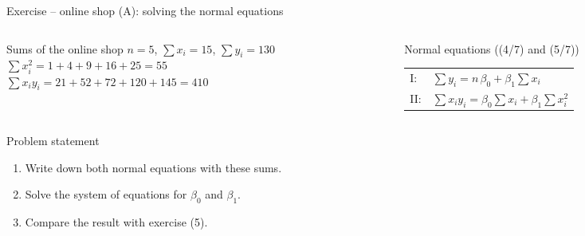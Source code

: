 \documentclass[aspectratio=169,11pt]{beamer}
\begin{document}
\begin{frame}{Exercise -- online shop (A): solving the normal equations}
  \begin{columns}[T]
    \begin{column}{0.49\textwidth}
      \begin{block}{Sums of the online shop}
        $n = 5$, \quad $\sum x_i = 15$, \quad $\sum y_i = 130$\\[2pt]
        $\sum x_i^{2} = 1 + 4 + 9 + 16 + 25 = 55$\\[2pt]
        $\sum x_i y_i = 21 + 52 + 72 + 120 + 145 = 410$
      \end{block}
    \end{column}
    \begin{column}{0.49\textwidth}
      \begin{block}{Normal equations ((4/7) and (5/7))}
        \renewcommand{\arraystretch}{1.6}
        \begin{tabular}{@{}l@{\ \ }l@{}}
          I:  & $\sum y_i = n\,\beta_0 + \beta_1 \sum x_i$ \\
          II: & $\sum x_i y_i = \beta_0 \sum x_i + \beta_1 \sum x_i^{2}$
        \end{tabular}
      \end{block}
    \end{column}
  \end{columns}

  \medskip

  \begin{block}{Problem statement}
    \begin{enumerate}
      \setlength{\itemsep}{2pt}
      \item Write down both normal equations with these sums.
      \item Solve the system of equations for $\beta_0$ and $\beta_1$.
      \item Compare the result with exercise (5).
    \end{enumerate}
  \end{block}
\end{frame}
\end{document}
